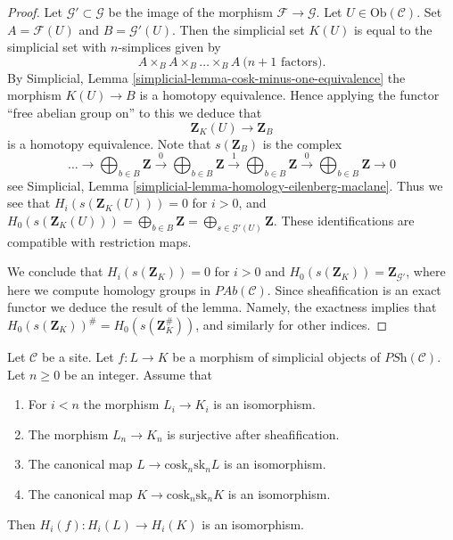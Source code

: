 \begin{proof}
Let $\mathcal{G}' \subset \mathcal{G}$ be the image of
the morphism $\mathcal{F} \to \mathcal{G}$.
Let $U \in \text{Ob}(\mathcal{C})$. Set
$A = \mathcal{F}(U)$ and $B = \mathcal{G}'(U)$.
Then the simplicial set $K(U)$ is equal to the simplicial
set with $n$-simplices given by
$$
A \times_B A \times_B \ldots \times_B A\ (n + 1 \text{ factors)}.
$$
By Simplicial, Lemma \ref{simplicial-lemma-cosk-minus-one-equivalence}
the morphism $K(U) \to B$ is a homotopy equivalence. Hence
applying the functor ``free abelian group on'' to this
we deduce that
$$
\mathbf{Z}_K(U) \longrightarrow \mathbf{Z}_B
$$
is a homotopy equivalence. Note that $s(\mathbf{Z}_B)$ is
the complex
$$
\ldots \to
\bigoplus\nolimits_{b \in B}\mathbf{Z} \xrightarrow{0}
\bigoplus\nolimits_{b \in B}\mathbf{Z} \xrightarrow{1}
\bigoplus\nolimits_{b \in B}\mathbf{Z} \xrightarrow{0}
\bigoplus\nolimits_{b \in B}\mathbf{Z} \to 0
$$
see Simplicial, Lemma \ref{simplicial-lemma-homology-eilenberg-maclane}.
Thus we see that
$H_i(s(\mathbf{Z}_K(U))) = 0$ for $i > 0$, and
$H_0(s(\mathbf{Z}_K(U))) = \bigoplus_{b \in B}\mathbf{Z}
= \bigoplus_{s \in \mathcal{G}'(U)} \mathbf{Z}$.
These identifications are compatible with restriction
maps.

\medskip\noindent
We conclude that $H_i(s(\mathbf{Z}_K)) = 0$ for $i > 0$ and
$H_0(s(\mathbf{Z}_K)) = \mathbf{Z}_{\mathcal{G}'}$, where here
we compute homology groups in $\textit{PAb}(\mathcal{C})$. Since
sheafification is an exact functor we deduce the result
of the lemma. Namely, the exactness implies
that $H_0(s(\mathbf{Z}_K))^\# = H_0(s(\mathbf{Z}_K^\#))$,
and similarly for other indices.
\end{proof}

\begin{lemma}
\label{lemma-acyclicity}
Let $\mathcal{C}$ be a site.
Let $f : L \to K$ be a morphism of
simplicial objects of $\textit{PSh}(\mathcal{C})$.
Let $n \geq 0$ be an integer.
Assume that
\begin{enumerate}
\item For $i < n$ the morphism $L_i \to K_i$ is an isomorphism.
\item The morphism $L_n \to K_n$ is surjective after sheafification.
\item The canonical map $L \to \text{cosk}_n \text{sk}_n L$ is an isomorphism.
\item The canonical map $K \to \text{cosk}_n \text{sk}_n K$ is an isomorphism.
\end{enumerate}
Then $H_i(f) : H_i(L) \to H_i(K)$ is an isomorphism.
\end{lemma}

